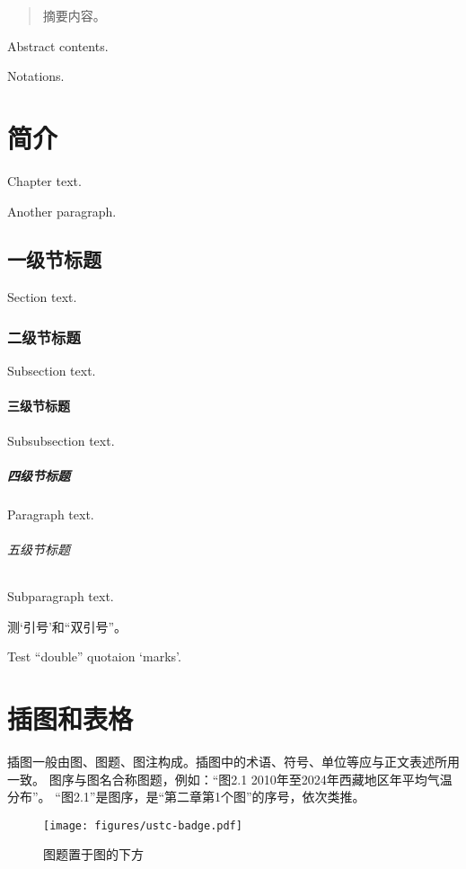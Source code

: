 \frontmatter
{}

\begin{abstract}
  摘要内容。
\end{abstract}

\begin{abstract*}
  Abstract contents.
\end{abstract*}

\tableofcontents

\begin{notation}
  Notations.
\end{notation}

\mainmatter
\chapter{简介}
Chapter text. \par
Another paragraph.
\section{一级节标题}
Section text.
\subsection{二级节标题}
Subsection text.
\subsubsection{三级节标题}
Subsubsection text.
\paragraph{四级节标题}
Paragraph text.
\subparagraph{五级节标题}
Subparagraph text.

测‘引号’和“双引号”。

Test “double” quotaion ‘marks’.

\chapter{插图和表格}

插图一般由图、图题、图注构成。插图中的术语、符号、单位等应与正文表述所用一致。
图序与图名合称图题，例如：“图2.1  2010年至2024年西藏地区年平均气温分布”。
“图2.1”是图序，是“第二章第1个图”的序号，依次类推。

\begin{figure}[h]
  \centering
  \texttt{[image: figures/ustc-badge.pdf]}
  \caption{图题置于图的下方}
  \label{fig:badge}
\end{figure}

